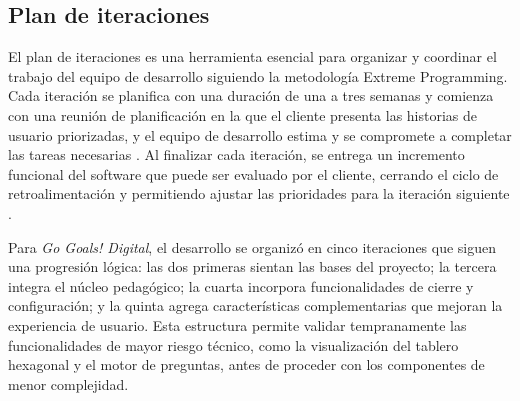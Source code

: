 \subsection{Plan de iteraciones}
\label{subsec:plan_iteraciones}

El plan de iteraciones es una herramienta esencial para organizar y coordinar el trabajo del equipo de desarrollo siguiendo la metodología Extreme Programming. Cada iteración se planifica con una duración de una a tres semanas y comienza con una reunión de planificación en la que el cliente presenta las historias de usuario priorizadas, y el equipo de desarrollo estima y se compromete a completar las tareas necesarias \parencite{Cohn2005}. Al finalizar cada iteración, se entrega un incremento funcional del software que puede ser evaluado por el cliente, cerrando el ciclo de retroalimentación y permitiendo ajustar las prioridades para la iteración siguiente \parencite{Beck2004}.

Para \textit{Go Goals! Digital}, el desarrollo se organizó en cinco iteraciones que siguen una progresión lógica: las dos primeras sientan las bases del proyecto; la tercera integra el núcleo pedagógico; la cuarta incorpora funcionalidades de cierre y configuración; y la quinta agrega características complementarias que mejoran la experiencia de usuario. Esta estructura permite validar tempranamente las funcionalidades de mayor riesgo técnico, como la visualización del tablero hexagonal y el motor de preguntas, antes de proceder con los componentes de menor complejidad.

